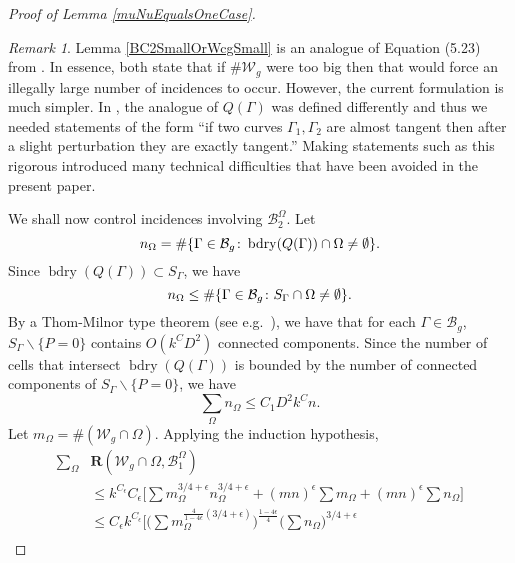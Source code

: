\documentclass[reqno]{amsart}
\theoremstyle{definition}
\theoremstyle{remark}
\newtheorem{rem}[thm]{Remark}
\theoremstyle{remark}
\newcommand{\WC}{\mathcal W}
\newcommand{\BC}{\mathcal B}
\newcommand{\bdry}{\operatorname{bdry}}
\newcommand{\rect}{\mathbf{R}}
\begin{document}
\begin{proof}[Proof of Lemma \ref{muNuEqualsOneCase}]
\begin{rem}
Lemma \ref{BC2SmallOrWcgSmall} is an analogue of Equation (5.23) from \cite{Zahl}. In essence, both state that if $\#\WC_g$ were too big then that would force an illegally large number of incidences to occur. However, the current formulation is much simpler. In  \cite{Zahl}, the analogue of $Q(\Gamma)$ was defined differently and thus we needed statements of the form ``if two curves $\Gamma_1,\Gamma_2$ are almost tangent then after a slight perturbation they are exactly tangent.'' Making statements such as this rigorous introduced many technical difficulties that have been avoided in the present paper.
\end{rem}


We shall now control incidences involving $\BC^\Omega_2$. Let
\begin{equation*}
n_\Omega=\#\{\Gamma\in\BC_g\colon \bdry(Q(\Gamma))\cap\Omega\neq\emptyset\}.\\
\end{equation*}
Since $\bdry(Q(\Gamma))\subset S_{\Gamma}$, we have
\begin{equation*}
n_\Omega\leq \#\{\Gamma\in\BC_g\colon S_\Gamma \cap\Omega\neq\emptyset\}.\\
\end{equation*}
By a Thom-Milnor type theorem (see e.g.~\cite[Theorem 1.1]{Barone}), we have that for each $\Gamma\in\BC_g$, $S_\Gamma\backslash \{P=0\}$ contains $O(k^CD^2)$ connected components. Since the number of cells that intersect $\bdry(Q(\Gamma))$ is bounded by the number of connected components of $S_\Gamma\backslash \{P=0\}$, we have
\begin{equation}\label{ThomMilnorBound}
 \sum_\Omega n_\Omega \leq C_1 D^2 k^{C} n.
\end{equation}
Let $m_\Omega=\#(\WC_g\cap\Omega)$. Applying the induction hypothesis,
\begin{equation}\label{rectWcBc1}
\begin{split}
 \sum_{\Omega}&\rect(\WC_g\cap\Omega,\BC^{\Omega}_1)\\
&\leq k^{C_\epsilon}C_\epsilon\bigg[ \sum m_\Omega^{3/4+\epsilon} n_{\Omega}^{3/4+\epsilon} +(mn)^{\epsilon}\sum m_\Omega+ (mn)^{\epsilon}\sum n_{\Omega}\bigg] \\
&\leq C_\epsilon k^{C_\epsilon}\bigg[\Big(\sum m_\Omega^{\frac{4}{1-4\epsilon}(3/4+\epsilon)}\Big)^{\frac{1-4\epsilon}{4}}\Big(\sum n_{\Omega}\Big)^{3/4+\epsilon}  \\

\end{split}
\end{equation}
\end{proof}
\end{document}
